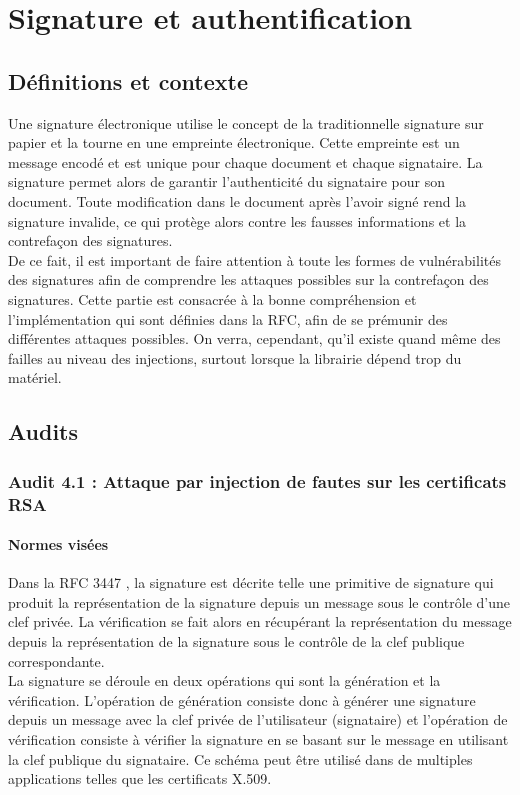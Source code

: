 \chapter{Signature et authentification}
\section{Définitions et contexte}

Une signature électronique utilise le concept de la traditionnelle signature sur papier et la tourne en une empreinte électronique. Cette empreinte est un message encodé et est unique pour chaque document et chaque signataire. La signature permet alors de garantir l'authenticité du signataire pour son document. Toute modification dans le document après l'avoir signé rend la signature invalide, ce qui protège alors contre les fausses informations et la contrefaçon des signatures.\\

De ce fait, il est important de faire attention à toute les formes de vulnérabilités des signatures afin de comprendre les attaques possibles sur la contrefaçon des signatures. Cette partie est consacrée à la bonne compréhension et l'implémentation qui sont définies dans la RFC, afin de se prémunir des différentes attaques possibles. On verra, cependant, qu'il existe quand même des failles au niveau des injections, surtout lorsque la librairie dépend trop du matériel. 


\section{Audits}
	\subsection{Audit 4.1 : Attaque par injection de fautes sur les certificats RSA}
		\subsubsection{Normes visées}
Dans la RFC 3447 \cite{rfc3447}, la signature est décrite telle une primitive de signature qui produit la représentation de la signature depuis un message sous le contrôle d'une clef privée. La vérification se fait alors en récupérant la représentation du message depuis la représentation de la signature sous le contrôle de la clef publique correspondante.\\

La signature se déroule en  deux opérations qui sont la génération et la vérification. L'opération de génération consiste donc à générer une signature depuis un message avec la clef privée de l'utilisateur (signataire) et l'opération de vérification consiste à vérifier la signature en se basant sur le message en utilisant la clef publique du signataire. 
Ce schéma peut être utilisé dans de multiples applications telles que les certificats X.509.\\


